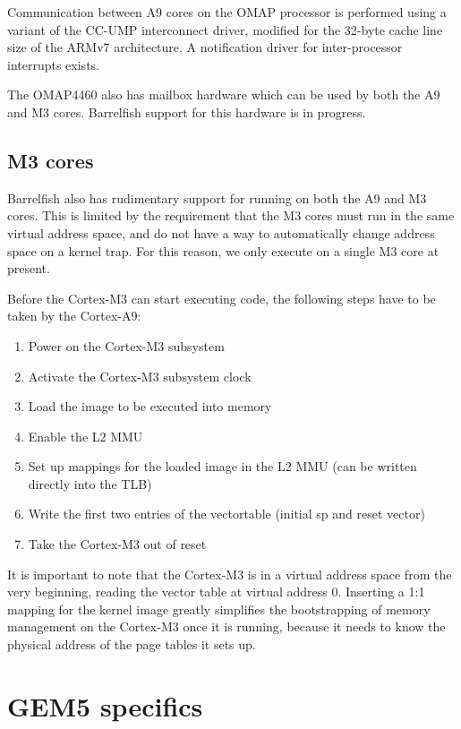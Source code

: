 \documentclass[a4paper,twoside]{report} %
\begin{document}
Communication between A9 cores on the OMAP processor is performed
using a variant of the CC-UMP interconnect driver, modified for the
32-byte cache line size of the ARMv7 architecture.  A notification
driver for inter-processor interrupts exists. 

The OMAP4460 also has mailbox hardware which can be used by both the
A9 and M3 cores.  Barrelfish support for this hardware is in
progress. 

\section{M3 cores}

Barrelfish also has rudimentary support for running on both the A9 and
M3 cores.  This is limited by the requirement that the M3 cores must
run in the same virtual address space, and do not have a way to
automatically change address space on a kernel trap.  For this reason,
we only execute on a single M3 core at present. 

Before the Cortex-M3 can start executing code, the following steps
have to be taken by the Cortex-A9:

\begin{enumerate}
\item Power on the Cortex-M3 subsystem
\item Activate the Cortex-M3 subsystem clock
\item Load the image to be executed into memory
\item Enable the L2 MMU
\item Set up mappings for the loaded image in the L2 MMU (can be
  written directly into the TLB)
\item Write the first two entries of the vectortable (initial sp and
  reset vector)
\item Take the Cortex-M3 out of reset
\end{enumerate}

It is important to note that the Cortex-M3 is in a virtual address
space from the very beginning, reading the vector table at virtual
address 0. Inserting a 1:1 mapping for the kernel image greatly
simplifies the bootstrapping of memory management on the Cortex-M3
once it is running, because it needs to know the physical address of
the page tables it sets up.

\chapter{GEM5 specifics}
\end{document}
